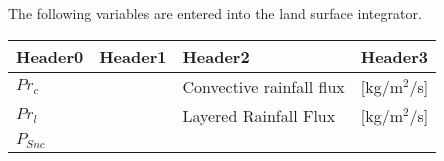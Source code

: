 The following variables are entered into the land surface integrator.

\begin{longtable}[]{@{}llll@{}}
\toprule
\begin{minipage}[b]{0.22\columnwidth}\raggedright
Header0\strut
\end{minipage} & \begin{minipage}[b]{0.22\columnwidth}\raggedright
Header1\strut
\end{minipage} & \begin{minipage}[b]{0.22\columnwidth}\raggedright
Header2\strut
\end{minipage} & \begin{minipage}[b]{0.22\columnwidth}\raggedright
Header3\strut
\end{minipage}\tabularnewline
\midrule
\endhead
\begin{minipage}[t]{0.22\columnwidth}\raggedright
\(Pr_{c}\)\strut
\end{minipage} & \begin{minipage}[t]{0.22\columnwidth}\raggedright
\strut
\end{minipage} & \begin{minipage}[t]{0.22\columnwidth}\raggedright
Convective rainfall flux\strut
\end{minipage} & \begin{minipage}[t]{0.22\columnwidth}\raggedright
{[}kg/m\(^2\)/s{]}\strut
\end{minipage}\tabularnewline
\begin{minipage}[t]{0.22\columnwidth}\raggedright
\(Pr_{l}\)\strut
\end{minipage} & \begin{minipage}[t]{0.22\columnwidth}\raggedright
\strut
\end{minipage} & \begin{minipage}[t]{0.22\columnwidth}\raggedright
Layered Rainfall Flux\strut
\end{minipage} & \begin{minipage}[t]{0.22\columnwidth}\raggedright
{[}kg/m\(^2\)/s{]}\strut
\end{minipage}\tabularnewline
\begin{minipage}[t]{0.22\columnwidth}\raggedright
\(P_{Snc}\)\strut
\end{minipage} & \begin{minipage}[t]{0.22\columnwidth}\raggedright
\strut
\end{minipage} & \begin{minipage}[t]{0.22\columnwidth}\raggedright

\end{minipage}
\end{longtable}
